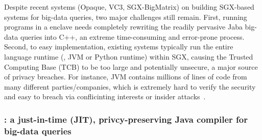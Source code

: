 Despite recent systems (Opaque, VC3, SGX-BigMatrix) on building SGX-based 
systems for big-data queries, two major challenges still remain. First,
running programs in a enclave needs completely rewriting the readily pervasive 
Jaba big-data queries into C++, an extreme time-consuming and error-prone 
process. Second, to easy implementation, existing systems typically run the 
entire language runtime (\eg, JVM or Python runtime) within SGX, causing the 
Trusted Computing Base (TCB) to be too large and potentially unsecure, a major 
source of privacy breaches. For instance, JVM contains millions of lines of 
code from many different parties/companies, which is extremely hard to verify 
the security and easy to breach via conflicinting interests or insider 
attacks~\cite{top-threats}.

\vspace{-.15in}
\subsubsection{\maat: a just-in-time (JIT), privcy-preserving Java compiler for 
big-data queries} 
\label{sec:ift-problem}\vspace{-.075in}

